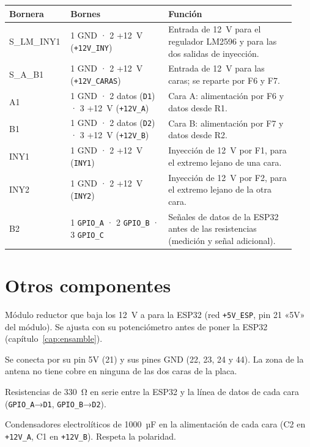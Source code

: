\begin{longtable}{@{}p{0.17\linewidth} p{0.33\linewidth} p{0.43\linewidth}@{}}
\toprule
\textbf{Bornera} & \textbf{Bornes} & \textbf{Función} \\ \midrule \endhead
S\_LM\_INY1 & 1 GND · 2 +12~V (\texttt{+12V\_INY}) & Entrada de 12~V para el regulador LM2596 y para las dos salidas de inyección. \\
S\_A\_B1 & 1 GND · 2 +12~V (\texttt{+12V\_CARAS}) & Entrada de 12~V para las caras; se reparte por F6 y F7. \\
A1 & 1 GND · 2 datos (\texttt{D1}) · 3 +12~V (\texttt{+12V\_A}) & Cara A: alimentación por F6 y datos desde R1. \\
B1 & 1 GND · 2 datos (\texttt{D2}) · 3 +12~V (\texttt{+12V\_B}) & Cara B: alimentación por F7 y datos desde R2. \\
INY1 & 1 GND · 2 +12~V (\texttt{INY1}) & Inyección de 12~V por F1, para el extremo lejano de una cara. \\
INY2 & 1 GND · 2 +12~V (\texttt{INY2}) & Inyección de 12~V por F2, para el extremo lejano de la otra cara. \\
B2 & 1 \texttt{GPIO\_A} · 2 \texttt{GPIO\_B} · 3 \texttt{GPIO\_C} & Señales de datos de la ESP32 antes de las resistencias (medición y señal adicional). \\
\bottomrule
\end{longtable}

\section{Otros componentes}

\begin{description}[leftmargin=0pt]
\item[LM1 · LM2596] Módulo reductor que baja los 12~V a  para la ESP32 (red \texttt{+5V\_ESP}, pin 21 «5V» del módulo). Se ajusta con su potenciómetro antes de poner la ESP32 (capítulo~\ref{cap:ensamble}).
\item[U1 · ESP32-S3] Se conecta por su pin 5V (21) y sus pines GND (22, 23, 24 y 44). La zona de la antena no tiene cobre en ninguna de las dos caras de la placa.
\item[R1 y R2] Resistencias de 330~Ω en serie entre la ESP32 y la línea de datos de cada cara (\texttt{GPIO\_A}→\texttt{D1}, \texttt{GPIO\_B}→\texttt{D2}).
\item[C1 y C2] Condensadores electrolíticos de 1000~µF en la alimentación de cada cara (C2 en \texttt{+12V\_A}, C1 en \texttt{+12V\_B}). Respeta la polaridad.
\end{description}

